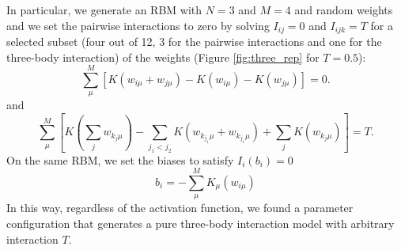 \documentclass[11pt,letterpaper]{article}
\begin{document}
In particular, we generate an RBM with $N=3$ and $M=4$ and random weights and we set the pairwise interactions to zero by solving $I_{ij}=0$ and $I_{ijk}=T$ for a selected subset (four out of 12, 3 for the pairwise interactions and one for the three-body interaction) of the weights (Figure \ref{fig:three_rep} for $T=0.5$):
\begin{equation*}
    \sum_{\mu}^M \left[ K\left( w_{i\mu}+w_{j\mu}\right)-K\left( w_{i\mu}\right)-K\left( w_{j\mu}\right)\right]=0.
\end{equation*}
and 
\begin{equation*}
    \sum_{\mu}^M \left[ K\left( \sum_{j}w_{k_j\mu}\right)-\sum_{j_1<j_2}K\left( w_{k_{j_1}\mu}+w_{k_{j_1}\mu}\right)+\sum_jK\left( w_{k_j\mu}\right)\right]=T.
\end{equation*}
On the same RBM, we set the biases to satisfy $I_{i}(b_i) = 0$
\begin{equation*}
     b_{i} =- \sum_{\mu}^M  K_{\mu}\left( w_{i\mu}\right)
\end{equation*}
In this way, regardless of the activation function, we found a parameter configuration that generates a pure three-body interaction model with arbitrary interaction $T$.


\newpage
\end{document}
